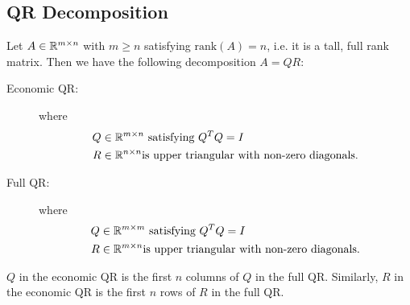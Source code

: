 \documentclass[../main/main.tex]{subfiles}
\begin{document}
\subsection{QR Decomposition}
Let $A\in \mathbb{R} ^{m \times  n}$ with $m\geq n$ satisfying $\text{rank}(A) = n$, i.e. it is a tall, full rank matrix. Then we have the following decomposition $A=QR$:
\begin{description}
  \item[Economic QR:] where \begin{align*}
                              Q&\in \mathbb{R}^{m \times  n} \text{ satisfying } Q^{T}Q = I\\
                              R &\in \mathbb{R} ^{n\times n} \text{is upper triangular with non-zero diagonals}
                              .\end{align*}
  \item[Full QR:] where\begin{align*}
                              Q&\in \mathbb{R}^{m \times  m} \text{ satisfying } Q^{T}Q = I\\
                              R &\in \mathbb{R} ^{m\times n} \text{is upper triangular with non-zero diagonals}
                              .\end{align*}
\end{description}
\begin{remark}
 $Q$ in the economic QR is the first $n$ columns of $Q$ in the full QR. Similarly, $R$ in the economic QR is the first $n$ rows of $R$ in the full QR.
\end{remark}
\end{document}
